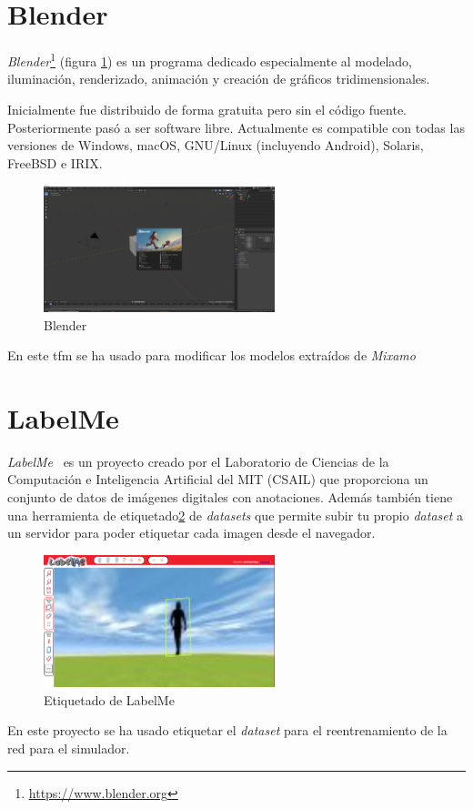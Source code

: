 \section{Blender}
\textit{Blender}\footnote{\url{https://www.blender.org}} (figura \ref{fig:blender}) es un programa dedicado especialmente al modelado, iluminación, renderizado, animación y creación de gráficos tridimensionales.

Inicialmente fue distribuido de forma gratuita pero sin el código fuente. Posteriormente pasó a ser software libre. Actualmente es compatible con todas las versiones de Windows, macOS, GNU/Linux (incluyendo Android), Solaris, FreeBSD e IRIX.
\begin{figure}[H]
  \begin{center}
    \includegraphics[width=0.6\textwidth]{figures/herramientas/blender.png}
		\caption{Blender}
		\label{fig:blender}
		\end{center}
\end{figure}
En este \acrshort{tfm} se ha usado para modificar los modelos extraídos de \textit{Mixamo}
\section{LabelMe}
\textit{LabelMe}~\cite{labelme} es un proyecto creado por el Laboratorio de Ciencias de la Computación e Inteligencia Artificial del MIT (CSAIL) que proporciona un conjunto de datos de imágenes digitales con anotaciones. Además también tiene una herramienta de etiquetado\ref{fig:labelme} de \textit{datasets} que permite subir tu propio \textit{dataset} a un servidor para poder etiquetar cada imagen desde el navegador.
\begin{figure}[H]
  \begin{center}
    \includegraphics[width=0.6\textwidth]{figures/herramientas/labelme.png}
		\caption{Etiquetado de LabelMe}
		\label{fig:labelme}
		\end{center}
\end{figure}

En este proyecto se ha usado etiquetar el \textit{dataset} para el reentrenamiento de la red para el simulador.
